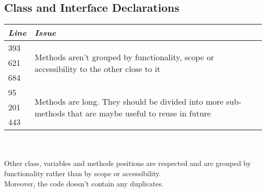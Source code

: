 \documentclass[11pt,a4paper]{report}
\begin{document}
\subsection{Class and Interface Declarations}
\begin{tabularx}{\textwidth}{|l|X|}
	\hline
	\textit{Line} & \textit{Issue}\\
	\hline
	393 & \multirow{3}{\linewidth}{Methods aren't grouped by functionality, scope or accessibility to the other close to it}\\
	621 & \\
	684 & \\
	\hline
	95 & \multirow{3}{\linewidth}{Methods are long. They should be divided into more sub-methods that are maybe useful to reuse in future}\\
	201 & \\
	443 & \\
	\hline
\end{tabularx}\\
\\
Other class, variables and methods positions are respected and are grouped by functionality rather than by scope or accessibility.\\Moreover, the code doesn't contain any duplicates.
\end{document}
